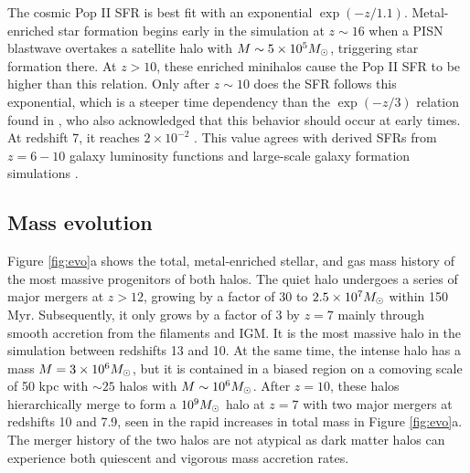 \documentclass[apjl]{emulateapj}
\begin{document}
The cosmic Pop II SFR is best fit with an exponential $\exp(-z/1.1)$.
Metal-enriched star formation begins early in the simulation at $z
\sim 16$ when a PISN blastwave overtakes a satellite halo with $M \sim
5 \times 10^5 \Ms$, triggering star formation there.  At $z>10$, these
enriched minihalos cause the Pop II SFR to be higher than this
relation.  Only after $z \sim 10$ does the SFR follows this
exponential, which is a steeper time dependency than the $\exp(-z/3)$
relation found in \citet{Hernquist03}, who also acknowledged that this
behavior should occur at early times.  At redshift 7, it reaches $2
\times 10^{-2}$ \sfr.  This value agrees with derived SFRs from
$z=6-10$ galaxy luminosity functions \citep[e.g.][]{Bouwens11} and
large-scale galaxy formation simulations \citep[e.g.][]{Schaye10}.

\subsection{Mass evolution}
\label{sec:halo}



\begin{figure*}
\caption{\label{fig:evo} (a) Evolution of the total halo mass (top),
  stellar mass (middle), and gas fraction (bottom) of the quiet
  (dashed) and intense (solid) halos.  In the top panel, the filtering
  halo mass is plotted as the thick black line (overlapping with the
  quiet halo after $z=9$.  (b) Mass-weighted stellar metallicities and
  gas metallicities enriched by Pop II and Pop III SNe of the intense
  (top) and quiet (bottom) halos.}
\end{figure*}


Figure \ref{fig:evo}a shows the total, metal-enriched stellar, and gas
mass history of the most massive progenitors of both halos.  The quiet
halo undergoes a series of major mergers at $z > 12$, growing by a
factor of 30 to $2.5 \times 10^7 \Ms$ within 150 Myr.  Subsequently,
it only grows by a factor of 3 by $z=7$ mainly through smooth
accretion from the filaments and IGM.  It is the most massive halo in
the simulation between redshifts 13 and 10.  At the same time, the
intense halo has a mass $M = 3 \times 10^6 \Ms$, but it is contained
in a biased region on a comoving scale of 50 kpc with $\sim25$ halos
with $M \sim 10^6 \Ms$.  After $z=10$, these halos hierarchically
merge to form a $10^9 \Ms$ halo at $z=7$ with two major mergers at
redshifts 10 and 7.9, seen in the rapid increases in total mass in
Figure \ref{fig:evo}a.  The merger history of the two halos are not
atypical as dark matter halos can experience both quiescent and
vigorous mass accretion rates.
\end{document}
